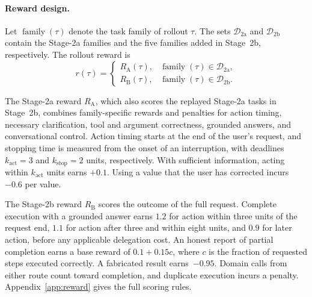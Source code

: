 \paragraph{Reward design.}
\label{sec:reward}
Let $\operatorname{family}(\tau)$ denote the task family of rollout $\tau$.
The sets $\mathcal{D}_{\mathrm{2a}}$ and $\mathcal{D}_{\mathrm{2b}}$ contain
the Stage-2a families and the five families added in Stage~2b, respectively.
The rollout reward is
\begin{equation}
\label{eq:reward}
 r(\tau)=
 \begin{cases}
 R_{\mathrm{A}}(\tau), & \operatorname{family}(\tau)\in\mathcal{D}_{\mathrm{2a}},\\
 R_{\mathrm{B}}(\tau), & \operatorname{family}(\tau)\in\mathcal{D}_{\mathrm{2b}}.
 \end{cases}
\end{equation}

The Stage-2a reward $R_{\mathrm A}$, which also scores the replayed Stage-2a tasks in Stage~2b, combines family-specific rewards and penalties for action timing, necessary clarification, tool and argument correctness, grounded answers, and conversational control. Action timing starts at the end of the user's request, and stopping time is measured from the onset of an interruption, with deadlines ${k_{\mathrm{act}}=3}$ and ${k_{\mathrm{stop}}=2}$ units, respectively. With sufficient information, acting within $k_{\mathrm{act}}$ units earns $+0.1$. Using a value that the user has corrected incurs $-0.6$ per value.

The Stage-2b reward $R_{\mathrm B}$ scores the outcome of the full request. Complete execution with a grounded answer earns $1.2$ for action within three units of the request end, $1.1$ for action after three and within eight units, and $0.9$ for later action, before any applicable delegation cost. An honest report of partial completion earns a base reward of $0.1+0.15c$, where $c$ is the fraction of requested steps executed correctly. A fabricated result earns~$-0.95$. Domain calls from either route count toward completion, and duplicate execution incurs a penalty. Appendix~\ref{app:reward} gives the full scoring rules.

